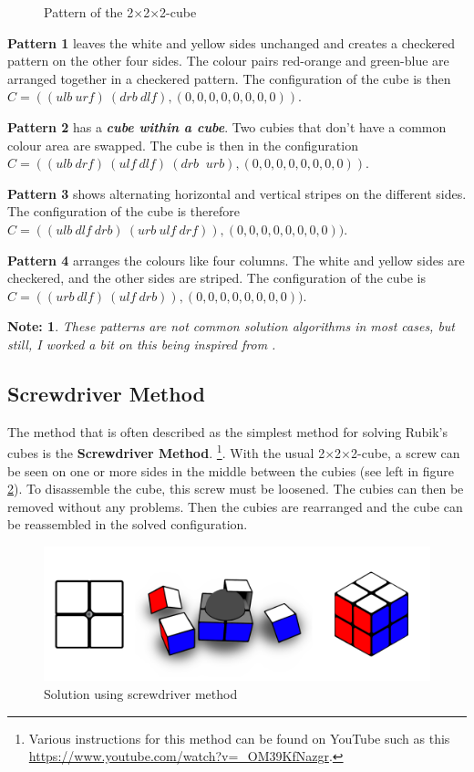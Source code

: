 \documentclass[12pt,a4paper]{article}
\theoremstyle{custom}
\newtheorem*{note}{Note:}
\newcommand{\Ttwo}{2$\times$2$\times$2-}
\begin{document}
\begin{figure}[H]
\caption{Pattern of the \Ttwo cube}
\label{Figure_Pattern}
\end{figure}

\textbf{Pattern 1} leaves the white and yellow sides unchanged and creates a checkered pattern on the other four sides. The colour pairs red-orange and green-blue are arranged together in a checkered pattern. The configuration of the cube is then $C = ((\textit{ulb} \ \textit{urf} ) \ ( \textit{drb} \ \textit{dlf} ),(0,0,0,0,0,0 ,0,0))$.

\textbf{Pattern 2} has a \textit{\textbf{cube within a cube}}. Two cubies that don't have a common colour area are swapped. The cube is then in the configuration $C = (( \textit{ulb} \ \textit{drf} ) \ ( \textit{ulf} \ \textit{dlf} ) \ ( \textit{drb} \ \textit{ urb} ),(0,0,0,0,0,0,0,0))$.

\textbf{Pattern 3} shows alternating horizontal and vertical stripes on the different sides. The configuration of the cube is therefore $C = (( \textit{ulb} \ \textit{dlf} \ \textit{drb} ) \ ( \textit{urb} \ \textit{ulf} \ \textit{drf} )) ,(0,0,0,0,0,0,0,0))$.

\textbf{Pattern 4} arranges the colours like four columns. The white and yellow sides are checkered, and the other sides are striped. The configuration of the cube is $C = ( (\textit{urb} \ \textit{dlf} ) \ ( \textit{ulf} \ \textit{drb} ) ),(0,0,0,0,0,0 ,0,0))$.

\begin{note}
    These patterns are not common solution algorithms in most cases, but still, I worked a bit on this being inspired from \cite{TD}.
\end{note}


\subsection{Screwdriver Method}

The method that is often described as the simplest method for solving Rubik's cubes is the \textbf{Screwdriver Method}. \footnote{Various instructions for this method can be found on YouTube such as this \url{https://www.youtube.com/watch?v=_OM39KfNazgr}.}.
With the usual \Ttwo cube, a screw can be seen on one or more sides in the middle between the cubies (see left in figure \ref{Figure_screwdriver method}).
To disassemble the cube, this screw must be loosened. The cubies can then be removed without any problems.
Then the cubies are rearranged and the cube can be reassembled in the solved configuration.
\begin{figure}[H]
\centering
\includegraphics[scale=0.2]{screw.png}
\caption{Solution using screwdriver method}
\label{Figure_screwdriver method}
\end{figure}
\end{document}
